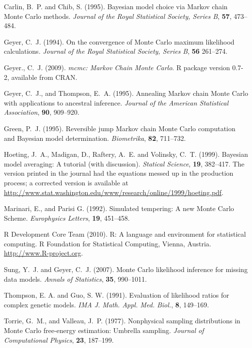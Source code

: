 \documentclass[11pt]{article}
\begin{document}
\begin{thebibliography}{}

Carlin, B.~P. and Chib, S. (1995).
\newblock Bayesian model choice via Markov chain Monte Carlo methods.
\newblock \emph{Journal of the Royal Statistical Society, Series B},
    \textbf{57}, 473--484.

Geyer, C.~J. (1994).
\newblock On the convergence of Monte Carlo maximum likelihood calculations.
\newblock \emph{Journal of the Royal Statistical Society, Series B},
    \textbf{56} 261--274.

Geyer., C.~J. (2009).
\newblock \emph{mcmc: Markov Chain Monte Carlo}.
\newblock R package version 0.7-2, available from CRAN.

Geyer, C.~J., and Thompson, E.~A. (1995).
\newblock Annealing Markov chain Monte Carlo with applications to ancestral
    inference.
\newblock \emph{Journal of the American Statistical Association}, \textbf{90},
    909--920.

Green, P.~J. (1995).
\newblock Reversible jump {M}arkov chain {M}onte {C}arlo computation and
  {B}ayesian model determination.
\newblock \emph{Biometrika}, \textbf{82}, 711--732.

Hoeting, J.~A., Madigan, D., Raftery, A.~E. and Volinsky, C.~T. (1999).
\newblock Bayesian model averaging: A tutorial (with discussion).
\newblock \emph{Statical Science}, \textbf{19}, 382--417.
\newblock The version printed in the journal had the equations messed up in
    the production process; a corrected version is available at
    \url{http://www.stat.washington.edu/www/research/online/1999/hoeting.pdf}.

Marinari, E., and Parisi G. (1992).
\newblock Simulated tempering: A new Monte Carlo Scheme.
\newblock \emph{Europhysics Letters}, \textbf{19}, 451--458.

R Development Core Team (2010).
\newblock R: A language and environment for statistical computing.
\newblock R Foundation for Statistical Computing, Vienna, Austria.
\newblock \url{http://www.R-project.org}.

Sung, Y.~J. and Geyer, C.~J. (2007).
\newblock Monte Carlo likelihood inference for missing data models.
\newblock \emph{Annals of Statistics}, \textbf{35}, 990--1011.

Thompson, E. A. and Guo, S. W. (1991).
\newblock Evaluation of likelihood ratios for complex genetic models.
\newblock \emph{IMA J. Math. Appl. Med. Biol.}, \textbf{8}, 149--169.

Torrie, G.~M., and Valleau, J.~P. (1977).
\newblock Nonphysical sampling distributions in Monte Carlo free-energy
  estimation: Umbrella sampling.
\newblock \emph{Journal of Computational Physics}, \textbf{23}, 187--199.

\end{thebibliography}
\end{document}
